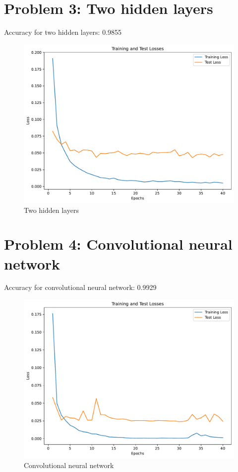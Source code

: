 \documentclass[a4paper]{article}
\begin{document}
\section*{Problem 3: Two hidden layers}

Accuracy for two hidden layers: 0.9855


\begin{figure}[H]
  \begin{center}
    \includegraphics[width=\textwidth]{ola/two_hidden_layer.pdf}
    \caption{Two hidden layers}
    \label{fig:two_hidden_layers}
  \end{center}
\end{figure}

\section*{Problem 4: Convolutional neural network}

Accuracy for convolutional neural network: 0.9929



\begin{figure}[H]
  \begin{center}
    \includegraphics[width=\textwidth]{ola/cnn.pdf}
    \caption{Convolutional neural network}
    \label{fig:convolutional_neural_network}
  \end{center}
\end{figure}
\end{document}
